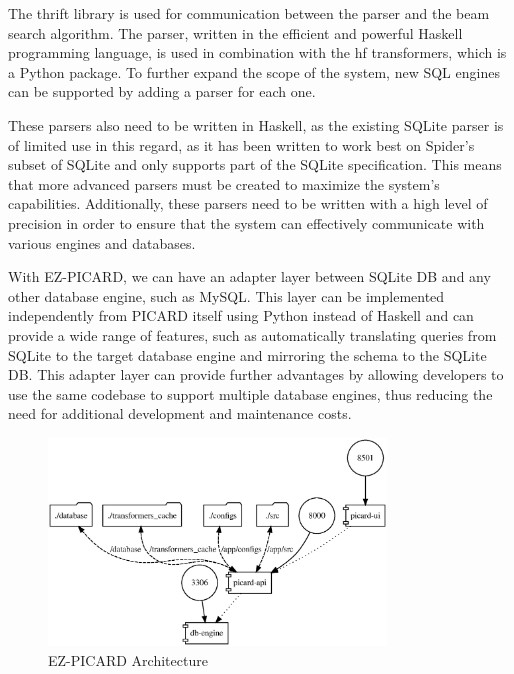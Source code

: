 
The thrift library is used for communication between the parser and the beam search algorithm. The parser, written in the efficient and powerful Haskell programming language, is used in combination with the hf transformers, which is a Python package. To further expand the scope of the system, new SQL engines can be supported by adding a parser for each one.

These parsers also need to be written in Haskell, as the existing SQLite parser is of limited use in this regard, as it has been written to work best on Spider's subset of SQLite and only supports part of the SQLite specification. This means that more advanced parsers must be created to maximize the system's capabilities. Additionally, these parsers need to be written with a high level of precision in order to ensure that the system can effectively communicate with various engines and databases.

With EZ-PICARD, we can have an adapter layer between SQLite DB and any other database engine, such as MySQL. This layer can be implemented independently from PICARD itself using Python instead of Haskell and can provide a wide range of features, such as automatically translating queries from SQLite to the target database engine and mirroring the schema to the SQLite DB. This adapter layer can provide further advantages by allowing developers to use the same codebase to support multiple database engines, thus reducing the need for additional development and maintenance costs.

\begin{figure}[h]
    \centering
    \includegraphics[width=0.8\textwidth]{pics/ez/mapeps}
    \caption{EZ-PICARD Architecture}
\end{figure}